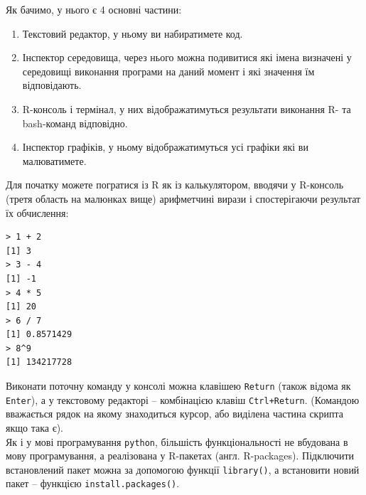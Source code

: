 \documentclass[a4paper, 12pt]{article}
\begin{document}
Як бачимо, у нього є 4 основні частини:
\begin{enumerate}
	\item Текстовий редактор, у ньому ви набиратимете код.%

	\item Інспектор середовища, через нього можна подивитися які імена визначені у середовищі виконання програми на даний момент і які значення їм відповідають.%

	\item R-консоль і термінал, у них відображатимуться результати виконання R- та bash-команд відповідно.%

	\item Інспектор графіків, у ньому відображатимуться усі графіки які ви малюватимете.%
\end{enumerate}

Для початку можете погратися із R як із калькулятором, вводячи у R-консоль (третя область на малюнках вище) арифметчині вирази і спостерігаючи результат їх обчислення:
\begin{verbatim}
> 1 + 2
[1] 3
> 3 - 4
[1] -1
> 4 * 5
[1] 20
> 6 / 7
[1] 0.8571429
> 8^9
[1] 134217728
\end{verbatim}

Виконати поточну команду у консолі можна клавішею \verb|Return| (також відома як \verb|Enter|), а у текстовому редакторі -- комбінацією клавіш \verb|Ctrl+Return|. (Командою вважається рядок на якому знаходиться курсор, або виділена частина скрипта якщо така є). \\

Як і у мові програмування \verb|python|, більшість функціональності не вбудована в мову програмування, а реалізована у R-пакетах (англ. R-packages). Підключити встановлений пакет можна за допомогою функції \verb|library()|, а встановити новий пакет -- функцією \verb|install.packages()|.
\end{document}
